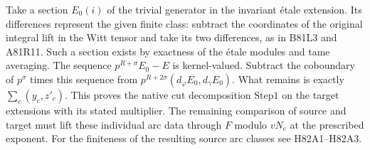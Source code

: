 Take a section $E_0(i)$ of the trivial generator in the invariant
\'etale extension. Its differences represent the given finite
class: subtract the coordinates of the original integral lift in
the Witt tensor and take its two differences, as in B81L3 and
A81R11. Such a section exists by exactness of the \'etale modules
and tame averaging. The sequence $p^{R+\sigma}E_0-E$ is
kernel-valued. Subtract the coboundary of $p^\sigma$ times this
sequence from $p^{R+2\sigma}(d_\varphi E_0,d_\gamma E_0)$.
What remains is exactly $\sum_c(y_c,z'_c)$.
This proves the native cut decomposition $\mathrm{Step1}$ on
the target extensions with its stated multiplier. The remaining comparison of source and target must lift these
individual arc data through $F$ modulo $vN_c$ at the prescribed
exponent. For the finiteness of the resulting source arc classes
see H82A1--H82A3.
